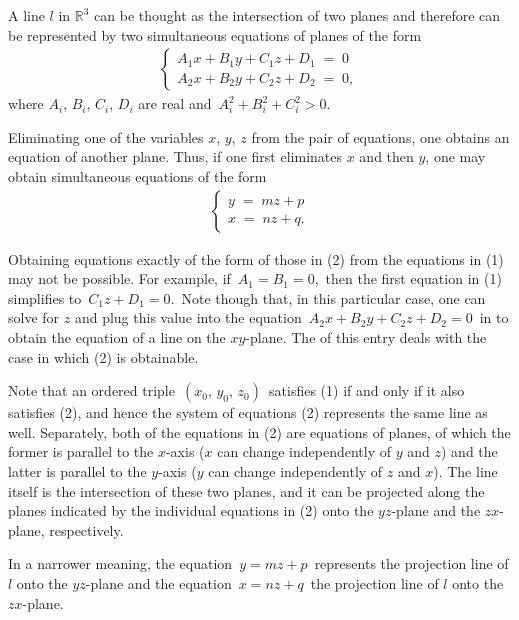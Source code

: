 \documentclass[12pt]{article}
\theoremstyle{definition}
\begin{document}

A line $l$ in $\mathbb{R}^3$ can be thought as the intersection of two planes and therefore can be represented by two simultaneous equations of planes of the form
\begin{align}
\begin{cases}
                A_1x\!+\!B_1y\!+\!C_1z\!+\!D_1 \;=\; 0\\  
                A_2x\!+\!B_2y\!+\!C_2z\!+\!D_2 \;=\; 0,
\end{cases}
\end{align}
where $A_i$, $B_i$, $C_i$, $D_i$ are real  and\, $A_i^2\!+\!B_i^2\!+\!C_i^2 > 0$.  

Eliminating one of the variables $x$, $y$, $z$ from the pair of equations, one obtains an equation of another plane.  Thus, if one first eliminates $x$ and then $y$, one may obtain simultaneous equations of the form
\begin{align}
\begin{cases}
                y \;=\; mz\!+\!p\\
                x \;=\; nz\!+\!q.
\end{cases}
\end{align}

Obtaining equations exactly of the form of those in (2) from the equations in (1) may not be possible.  For example, if \,$A_1 = B_1 = 0$,\, then the first equation in (1) simplifies to\, $C_1z\!+\!D_1 = 0$.\,  Note though that, in this particular case, one can solve for $z$ and plug this value into the equation\, 
$A_2x\!+\!B_2y\!+\!C_2z\!+\!D_2 = 0$\, in  to obtain the equation of a line on the $xy$-plane.  The  of this entry deals with the case in which (2) is obtainable.

Note that an ordered triple \,$(x_0,\,y_0,\,z_0)$\, satisfies (1) if and only if it also satisfies (2), and hence the system of equations (2) represents the same line as well.  Separately, both of the equations in (2) are equations of planes, of which the former is parallel to the $x$-axis ($x$ can change independently of $y$ and $z$) and the latter is parallel to the $y$-axis ($y$ can change independently of $z$ and $x$).  The line itself is the intersection of these two planes, and it can be projected along the planes indicated by the individual equations in (2) onto the $yz$-plane and the $zx$-plane, respectively.  

In a narrower meaning, the equation\, $y = mz\!+\!p$\, represents the projection line of $l$ onto the $yz$-plane and the equation\, $x = nz\!+\!q$\, the projection line of $l$ onto the $zx$-plane.\\
\end{document}
